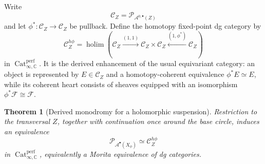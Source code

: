 \documentclass[12pt]{amsart}
\newtheorem{thm}{Theorem}[section]
\theoremstyle{definition}
\theoremstyle{remark}
\numberwithin{equation}{section}
\newcommand{\CA}{\mathcal A}
\newcommand{\C}{\mathbb C}
\begin{document}
Write
\[
\mathcal C_Z=\mathcal P_{\CA^{0,\bullet}(Z)}
\]
and let \(\phi^*:\mathcal C_Z\to\mathcal C_Z\) be pullback.  Define the
homotopy fixed-point dg category by
\[
\mathcal C_Z^{h\phi}
=
\operatorname*{holim}\left(
\mathcal C_Z
\xrightarrow{(1,1)}
\mathcal C_Z\times\mathcal C_Z
\xleftarrow{(1,\phi^*)}
\mathcal C_Z
\right)
\]
in \(\operatorname{Cat}^{\mathrm{perf}}_{\infty,\C}\).  It is the derived
enhancement of the usual equivariant category: an object is represented by
\(E\in\mathcal C_Z\) and a homotopy-coherent equivalence
\(\phi^*E\simeq E\), while its coherent heart consists of sheaves equipped
with an isomorphism \(\phi^*\mathcal F\cong\mathcal F\).

\begin{thm}[Derived monodromy for a holomorphic suspension]
\label{thm:suspension-derived-monodromy}
Restriction to the transversal \(Z\), together with continuation once
around the base circle, induces an equivalence
\[
\boxed{
\mathcal P_{\CA^\bullet(X_\phi)}
\simeq
\mathcal C_Z^{h\phi}
}
\]
in \(\operatorname{Cat}^{\mathrm{perf}}_{\infty,\C}\), equivalently a
Morita equivalence of dg categories.
\end{thm}
\end{document}
